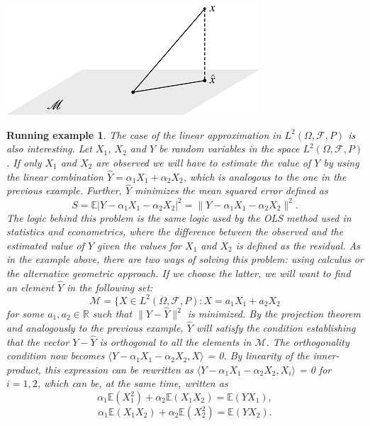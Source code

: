 \documentclass{article}
\newtheorem*{exmpl}{Running example}
\begin{document}
\begin{center}
\includegraphics{fig1.png} \newline
\end{center}

\begin{exmpl}
The case of the linear approximation in $L^2(\Omega, \mathscr{F}, P)$ is also interesting. Let ${X_1}$, ${X_2}$ and $Y$ be random variables in the space $L^2(\Omega, \mathscr{F}, P)$. If only ${X_1}$ and ${X_2}$ are observed we will have to estimate the value of $Y$ by using the linear combination $\hat{Y} = \alpha_1X_1 + \alpha_2X_2$, which is analogous to the one in the previous example. Further, $\hat{Y}$ minimizes the mean squared error defined as \[S = \mathbb E|Y - \alpha_1X_1 - \alpha_2X_2|^2 = \lVert Y -  \alpha_1X_1 - \alpha_2X_2 \rVert^2.\]
The logic behind this problem is the same logic used by the OLS method used in statistics and econometrics, where the difference between the observed and the estimated value of $Y$ given the values for $X_1$ and $X_2$ is defined as the residual. As in the example above, there are two ways of solving this problem: using calculus or the alternative geometric approach. If we choose the latter, we will want to find an element $\hat{Y}$ in the following set: 
\[
\mathscr{M} = \{X \in L^2(\Omega, \mathscr{F}, P) : X = a_1X_1 + a_2X_2
\] 
for some $a_1, a_2 \in \mathbb{R}$ such that $\lVert Y -  \hat{Y} \rVert^2$ is minimized. By the projection theorem and analogously to the previous example, $\hat{Y}$ will satisfy the condition establishing that the vector $Y - \hat{Y}$ is orthogonal to all the elements in $\mathscr{M}$. The orthogonality condition now becomes $\langle Y - \alpha_1X_1 - \alpha_2X_2, X \rangle$ = 0. By linearity of the inner-product, this expression can be rewritten as $\langle Y - \alpha_1X_1 - \alpha_2X_2, X_i \rangle$ = 0 for $i = 1,2$, which can be, at the same time, written as
\[
\alpha_1 \mathbb E(X_1^2) + \alpha_2 \mathbb E(X_1X_2) = \mathbb E(YX_1),
\]
\[
\alpha_1 \mathbb E(X_1X_2) + \alpha_2 \mathbb E(X_2^2) = \mathbb E(YX_2).
\]
\end{exmpl}
\end{document}
